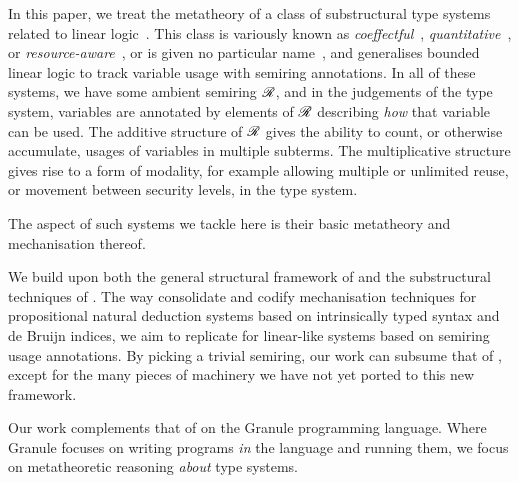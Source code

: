 
In this paper, we treat the metatheory of a class of substructural type
systems related to linear logic~\cite{girard87linear}.
This class is variously known as
\emph{coeffectful}~\cite{PetricekOM14,Granule18},
\emph{quantitative}~\cite{BrunelGMZ14,Atkey18}, or
\emph{resource-aware}~\cite{GhicaS14},
or is given no particular name~\cite{reed10distance,abadi99core},
and generalises bounded linear logic to track variable usage with semiring
annotations.
In all of these systems, we have some ambient semiring $\mathscr R$, and in the
judgements of the type system, variables are annotated by elements of $\mathscr R$
describing \emph{how} that variable can be used.
The additive structure of $\mathscr R$ gives the ability to count, or otherwise
accumulate, usages of variables in multiple subterms.
The multiplicative structure gives rise to a form of modality, for example
allowing multiple or unlimited reuse, or movement between security levels, in
the type system.

The aspect of such systems we tackle here is their basic metatheory and
mechanisation thereof.

We build upon both the general structural framework of
\citet{AACMM21} and the substructural techniques of \citet{WA20}.
The way \citeauthor{AACMM21} consolidate and codify mechanisation techniques for
propositional natural deduction systems based on intrinsically typed syntax and
de Bruijn indices, we aim to replicate for linear-like systems based on
semiring usage annotations.
By picking a trivial semiring, our work can subsume that of
\citeauthor{AACMM21}, except for the many pieces of machinery we have not yet
ported to this new framework.

Our work complements that of \citet{Granule18} on the Granule programming
language.
Where Granule focuses on writing programs \emph{in} the language and running
them, we focus on metatheoretic reasoning \emph{about} type systems.


